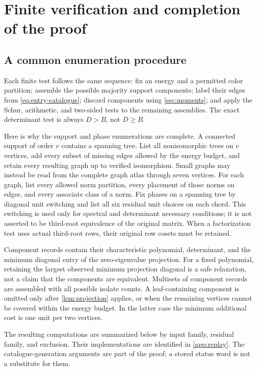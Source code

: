 \section{Finite verification and completion of the proof}\label{sec:finite}
\subsection{A common enumeration procedure}\label{sec:enumeration}
Each finite test follows the same sequence: fix an energy and a permitted color partition; assemble the possible majority support components; label their edges from \eqref{eq:entry-catalogue}; discard components using \cref{sec:moments}; and apply the Schur, arithmetic, and two-sided tests to the remaining assemblies. The exact determinant test is always $D>B$, not $D\ge B$.

Here is why the support and phase enumerations are complete. A connected support of order $v$ contains a spanning tree. List all nonisomorphic trees on $v$ vertices, add every subset of missing edges allowed by the energy budget, and retain every resulting graph up to verified isomorphism. Small graphs may instead be read from the complete graph atlas through seven vertices. For each graph, list every allowed norm partition, every placement of those norms on edges, and every associate class of a norm. Fix phases on a spanning tree by diagonal unit switching and list all six residual unit choices on each chord. This switching is used only for spectral and determinant necessary conditions; it is not asserted to be third-root equivalence of the original matrix. When a factorization test uses actual third-root rows, their original row cosets must be retained.

Component records contain their characteristic polynomial, determinant, and the minimum diagonal entry of the zero-eigenvalue projection. For a fixed polynomial, retaining the largest observed minimum projection diagonal is a safe relaxation, not a claim that the components are equivalent. Multisets of component records are assembled with all possible isolate counts. A leaf-containing component is omitted only after \cref{lem:projection} applies, or when the remaining vertices cannot be covered within the energy budget. In the latter case the minimum additional cost is one unit per two vertices.

The resulting computations are summarized below by input family, residual family, and exclusion. Their implementations are identified in \cref{app:replay}. The catalogue-generation arguments are part of the proof; a stored status word is not a substitute for them.

